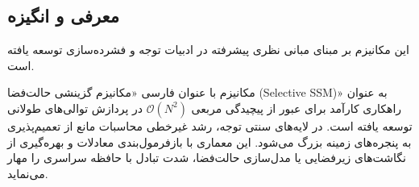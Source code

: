 \subsection{معرفی و انگیزه}
این مکانیزم بر مبنای مبانی نظری پیشرفته در ادبیات توجه و فشرده‌سازی \cite{gu2023mamba} توسعه یافته است.

مکانیزم  با عنوان فارسی «مکانیزم گزینشی حالت‌فضا (Selective SSM)» به عنوان راهکاری کارآمد برای عبور از پیچیدگی مربعی $\mathcal{O}(N^2)$ در پردازش توالی‌های طولانی توسعه یافته است. در لایه‌های سنتی توجه، رشد غیرخطی محاسبات مانع از تعمیم‌پذیری به پنجره‌های زمینه بزرگ می‌شود. این معماری با بازفرمول‌بندی معادلات و بهره‌گیری از نگاشت‌های زیرفضایی یا مدل‌سازی حالت‌فضا، شدت تبادل با حافظه سراسری را مهار می‌نماید.
